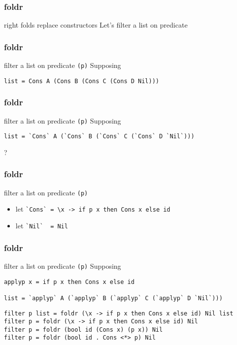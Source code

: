%

\begin{frame}[fragile]
\frametitle{foldr}
\begin{block}{right folds replace constructors}
Let's filter a list on predicate
\end{block}
\end{frame}

\begin{frame}[fragile]
\frametitle{foldr}
\begin{block}{filter a list on predicate \lstinline{(p)}}
Supposing 
\begin{lstlisting}[style=haskell,basicstyle=\tiny\ttfamily,mathescape]
list = Cons A (Cons B (Cons C (Cons D Nil)))
\end{lstlisting}
\end{block}
\end{frame}

\begin{frame}[fragile]
\frametitle{foldr}
\begin{block}{filter a list on predicate \lstinline{(p)}}
Supposing 
\begin{lstlisting}[style=haskell,basicstyle=\tiny\ttfamily,mathescape]
list = `Cons` A (`Cons` B (`Cons` C (`Cons` D `Nil`)))
\end{lstlisting}
\end{block}
\begin{center}
\LARGE
?
\end{center}
\end{frame}

\begin{frame}[fragile]
\frametitle{foldr}
\begin{block}{filter a list on predicate \lstinline{(p)}}
\begin{itemize}
\item let \lstinline{`Cons` = \x -> if p x then Cons x else id}
\item let \lstinline{`Nil`  = Nil}
\end{itemize}
\end{block}
\end{frame}

\begin{frame}[fragile]
\frametitle{foldr}
\begin{block}{filter a list on predicate \lstinline{(p)}}
Supposing
\begin{lstlisting}[style=haskell,basicstyle=\tiny\ttfamily,mathescape]
applyp x = if p x then Cons x else id

list = `applyp` A (`applyp` B (`applyp` C (`applyp` D `Nil`)))
\end{lstlisting}
\end{block}
\begin{lstlisting}[style=haskell,basicstyle=\scriptsize\ttfamily,mathescape]
filter p list = foldr (\x -> if p x then Cons x else id) Nil list
filter p = foldr (\x -> if p x then Cons x else id) Nil
filter p = foldr (bool id (Cons x) (p x)) Nil
filter p = foldr (bool id . Cons <*> p) Nil
\end{lstlisting}
\end{frame}


